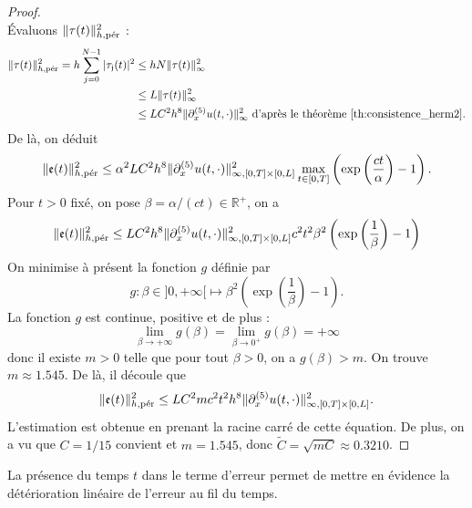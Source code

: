 \begin{proof}
\begin{equation}
\end{equation}
Évaluons $\| \tau(t) \|_{h,\per}^2$ :
\begin{align*}
\|\mathfrak{\tau}(t)\|_{h,\per}^2 = h \gsum_{j=0}^{N-1} |\mathfrak{\tau_j}(t)|^2 & \leq h N \|\mathfrak{\tau}(t)\|_{\infty}^2 \\
	& \leq  L \|\mathfrak{\tau}(t)\|_{\infty}^2 \\
	& \leq L C^2 h^8  \| \partial_x^{(5)} u(t,\cdot) \|_{\infty}^2 \text{ d'après le théorème \ref{th:consistence_herm2}.}
\end{align*}
De là, on déduit
\begin{equation}
\|\mathfrak{e}(t)\|_{h,\per}^2 \leq \alpha^2 L C^2 h^8  \| \partial_x^{(5)} u(t,\cdot) \|_{\infty,[0,T] \times [0,L]}^2 \max_{t \in [0,T]} \left( \exp \left( \dfrac{ct}{\alpha} \right) -1  \right).
\end{equation}
Pour $t>0$ fixé, on pose $\beta = \alpha/(ct) \in \mathbb{R}^+$, on a 
\begin{equation}
\|\mathfrak{e}(t)\|_{h,\per}^2 \leq L C^2 h^8  \| \partial_x^{(5)} u(t,\cdot) \|_{\infty,[0,T] \times [0,L]}^2 c^2 t^2 \beta^2 \left( \exp \left( \dfrac{1}{\beta} \right) -1  \right)
\end{equation}
On minimise à présent la fonction $g$ définie par
\begin{equation}
g :\beta \in ]0 , + \infty[ \mapsto \beta^2 \left( \exp \left( \dfrac{1}{\beta} \right) -1  \right).
\end{equation}
La fonction $g$ est continue, positive et de plus :
\begin{equation}
\lim_{\beta \rightarrow + \infty} g(\beta) = \lim_{\beta \rightarrow 0^+} g(\beta) = + \infty
\end{equation}
donc il existe $m > 0$ telle que pour tout $\beta > 0$, on a $g(\beta)>m$. On trouve $m \approx 1.545$. De là, il découle que
\begin{equation*}
\|\mathfrak{e}(t)\|_{h,\per}^2 \leq L C^2 m c^2 t^2 h^8  \| \partial_x^{(5)} u(t,\cdot) \|_{\infty,[0,T] \times [0,L]}^2.
\end{equation*}
L'estimation est obtenue en prenant la racine carré de cette équation. De plus, on a vu que $C = 1/15$ convient et $m=1.545$, donc $\tilde{C} = \sqrt{mC} \approx 0.3210$.
\end{proof}

La présence du temps $t$ dans le terme d'erreur permet de mettre en évidence la détérioration linéaire de l'erreur au fil du temps. 

